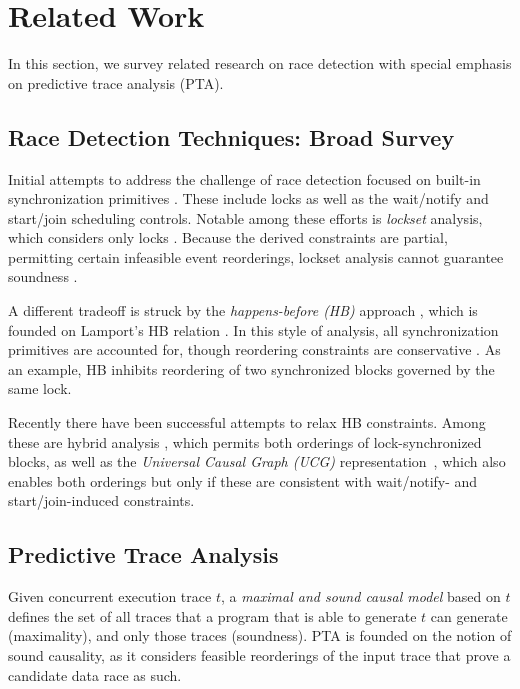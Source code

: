 \section{Related Work}

In this section, we survey related research on race detection with special emphasis on predictive trace analysis (PTA).

\subsection{Race Detection Techniques: Broad Survey} 

Initial attempts to address the challenge of race detection focused on built-in synchronization primitives \cite{eraser,SasturkarAWS05,vonPraun:2001,Choi:2002}. These include locks as well as the wait/notify and start/join scheduling controls. Notable among these efforts is \emph{lockset} analysis, which considers only locks \cite{eraser}. Because the derived constraints are partial, permitting certain infeasible event reorderings, lockset analysis cannot guarantee soundness \cite{Naik:2006}. 

A different tradeoff is struck by the \emph{happens-before (HB)} approach \cite{Christiaens,Dinning:1990,Mellor-Crummey:1991}, which is founded on Lamport's HB relation \cite{Lamport}. In this style of analysis, all synchronization primitives are accounted for, though reordering constraints are conservative . As an example, HB inhibits reordering of two synchronized blocks governed by the same lock. 


Recently there have been successful attempts to relax HB constraints. Among these are hybrid analysis \cite{hybrid}, which permits both orderings of lock-synchronized blocks, as well as the \emph{Universal Causal Graph (UCG)} representation~\cite{ucg}, which also enables both orderings but only if these are consistent with wait/notify- and start/join-induced constraints.

\subsection{Predictive Trace Analysis}

Given concurrent execution trace $t$, a \emph{maximal and sound causal model} based on $t$ defines the set of all traces that a program that is able to generate $t$ can generate (maximality), and only those traces (soundness). PTA is founded on the notion of sound causality, as it considers feasible reorderings of the input trace that prove a candidate data race as such. 

